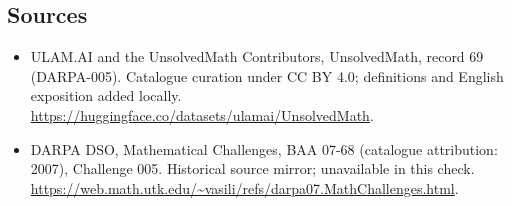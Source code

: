 \documentclass[11pt]{article}
\begin{document}
\subsection{Sources}
\begin{itemize}
\item[\hypertarget{source:69:1}{S1}] ULAM.AI and the UnsolvedMath Contributors, UnsolvedMath, record 69 (DARPA-005). Catalogue curation under CC BY 4.0; definitions and English exposition added locally.
\url{https://huggingface.co/datasets/ulamai/UnsolvedMath}.
\item[\hypertarget{source:69:2}{S2}] DARPA DSO, Mathematical Challenges, BAA 07-68 (catalogue attribution: 2007), Challenge 005. Historical source mirror; unavailable in this check.
\url{https://web.math.utk.edu/~vasili/refs/darpa07.MathChallenges.html}.
\end{itemize}
\label{end:69}
\end{document}

